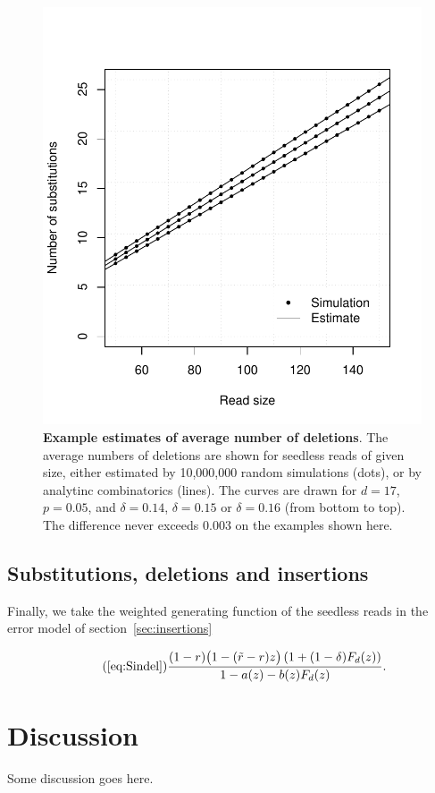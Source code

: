 \documentclass{article}
\begin{document}
\begin{figure}[h]
\centering
\includegraphics[scale=0.445]{simuldel-average2.pdf}
\caption{\textbf{Example estimates of average number of deletions}. The
average numbers of deletions are shown for seedless reads of given size,
either estimated by 10,000,000 random simulations (dots), or by analytinc
combinatorics (lines). The curves are drawn for $d=17$, $p=0.05$, and
$\delta=0.14$, $\delta=0.15$ or $\delta=0.16$ (from bottom to top). The
difference never exceeds 0.003 on the examples shown here.}
\label{fig:simulavdel}
\end{figure}




\subsection{Substitutions, deletions and insertions}

Finally, we take the weighted generating function of the seedless reads in
the error model of section~\ref{sec:insertions}

\begin{equation}
\tag{\ref{eq:Sindel}}
\frac{(1-r)\big( 1-(\tilde{r}-r)z \big) \left(1+(1-\delta)F_d(z)
\right)}{1-a(z)-b(z)F_d(z)}.
\end{equation}

\section{Discussion}

Some discussion goes here.





\end{document}

